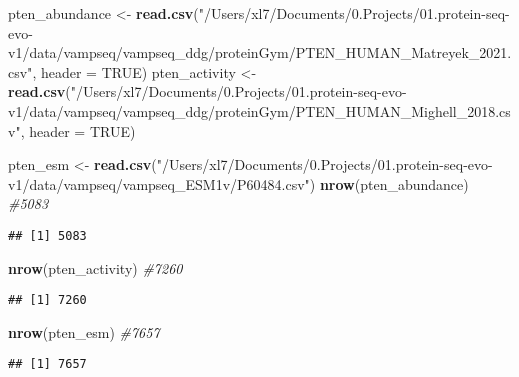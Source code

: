 \documentclass[
]{article}
\newenvironment{Shaded}{\begin{snugshade}}{\end{snugshade}}
\newcommand{\AttributeTok}[1]{\textcolor[rgb]{0.13,0.29,0.53}{#1}}
\newcommand{\CommentTok}[1]{\textcolor[rgb]{0.56,0.35,0.01}{\textit{#1}}}
\newcommand{\ConstantTok}[1]{\textcolor[rgb]{0.56,0.35,0.01}{#1}}
\newcommand{\FunctionTok}[1]{\textcolor[rgb]{0.13,0.29,0.53}{\textbf{#1}}}
\newcommand{\NormalTok}[1]{#1}
\newcommand{\OtherTok}[1]{\textcolor[rgb]{0.56,0.35,0.01}{#1}}
\newcommand{\StringTok}[1]{\textcolor[rgb]{0.31,0.60,0.02}{#1}}
\begin{document}
\begin{Shaded}
\begin{Highlighting}[]
\NormalTok{pten\_abundance }\OtherTok{\textless{}{-}} \FunctionTok{read.csv}\NormalTok{(}\StringTok{"/Users/xl7/Documents/0.Projects/01.protein{-}seq{-}evo{-}v1/data/vampseq/vampseq\_ddg/proteinGym/PTEN\_HUMAN\_Matreyek\_2021.csv"}\NormalTok{, }\AttributeTok{header =} \ConstantTok{TRUE}\NormalTok{)}
\NormalTok{pten\_activity }\OtherTok{\textless{}{-}} \FunctionTok{read.csv}\NormalTok{(}\StringTok{"/Users/xl7/Documents/0.Projects/01.protein{-}seq{-}evo{-}v1/data/vampseq/vampseq\_ddg/proteinGym/PTEN\_HUMAN\_Mighell\_2018.csv"}\NormalTok{, }\AttributeTok{header =} \ConstantTok{TRUE}\NormalTok{)}

\NormalTok{pten\_esm }\OtherTok{\textless{}{-}} \FunctionTok{read.csv}\NormalTok{(}\StringTok{"/Users/xl7/Documents/0.Projects/01.protein{-}seq{-}evo{-}v1/data/vampseq/vampseq\_ESM1v/P60484.csv"}\NormalTok{)}
\FunctionTok{nrow}\NormalTok{(pten\_abundance) }\CommentTok{\#5083}
\end{Highlighting}
\end{Shaded}

\begin{verbatim}
## [1] 5083
\end{verbatim}

\begin{Shaded}
\begin{Highlighting}[]
\FunctionTok{nrow}\NormalTok{(pten\_activity) }\CommentTok{\#7260}
\end{Highlighting}
\end{Shaded}

\begin{verbatim}
## [1] 7260
\end{verbatim}

\begin{Shaded}
\begin{Highlighting}[]
\FunctionTok{nrow}\NormalTok{(pten\_esm) }\CommentTok{\#7657}
\end{Highlighting}
\end{Shaded}

\begin{verbatim}
## [1] 7657
\end{verbatim}
\end{document}

